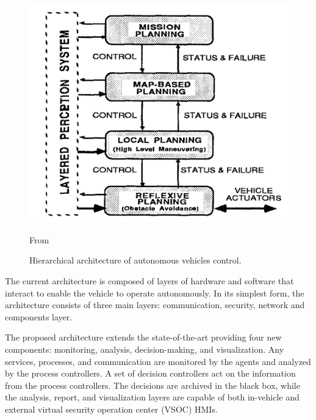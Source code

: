 \begin{figure}[!htb]
    \centering
    \includegraphics[width=0.7\linewidth]{figures/state-architecture}
    \caption{Hierarchical architecture of autonomous vehicles control.}
    \footnotesize{From \cite{architecture} }
    \label{fig:architecture}
\end{figure}

The current architecture is composed of layers of hardware and software that interact to enable the vehicle to operate autonomously.
In its simplest form, the architecture consists of three main layers: communication, security, network and components layer.

The proposed architecture extends the state-of-the-art providing four new components: monitoring, analysis, decision-making, and visualization.
Any services, processes, and communication are monitored
by the agents and analyzed by the process controllers.
A set of decision controllers act
on the information from the process controllers.
The decisions are archived in the black
box, while the analysis, report, and visualization layers are capable of both in-vehicle and
external virtual security operation center (VSOC) HMIs.

